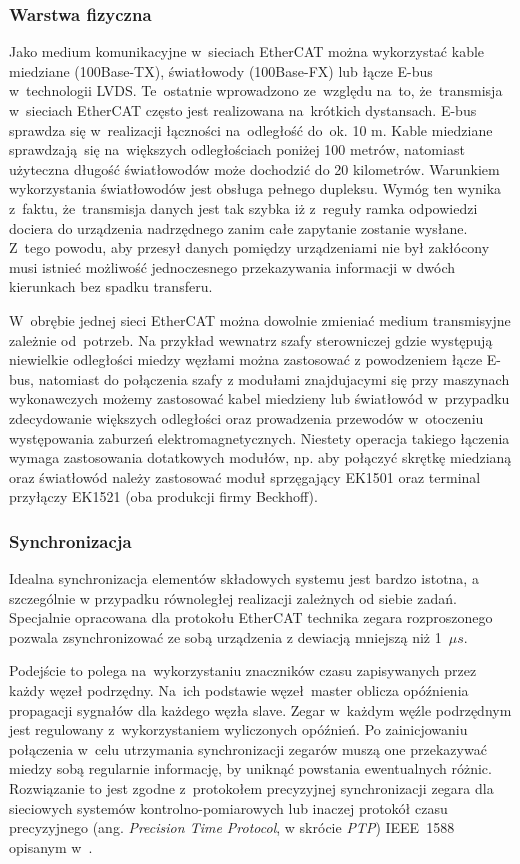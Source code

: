 \subsubsection{Warstwa fizyczna}
Jako medium komunikacyjne w~sieciach EtherCAT można wykorzystać kable miedziane (100Base-TX), światłowody (100Base-FX) lub łącze E-bus w~technologii LVDS. Te~ostatnie wprowadzono ze~względu na~to, że~transmisja w~sieciach EtherCAT często jest realizowana na~krótkich dystansach. E-bus sprawdza się w~realizacji łączności na~odległość do~ok. 10 m. Kable miedziane sprawdzają~się na~większych odległościach poniżej 100 metrów, natomiast użyteczna długość światłowodów może dochodzić do 20 kilometrów. Warunkiem wykorzystania światłowodów jest obsługa pełnego dupleksu. Wymóg ten wynika z~faktu, że~transmisja danych jest tak szybka iż z~reguły ramka odpowiedzi dociera do urządzenia nadrzędnego zanim całe zapytanie zostanie wysłane. Z~tego powodu, aby przesył danych pomiędzy urządzeniami nie był zakłócony musi istnieć możliwość jednoczesnego przekazywania informacji w dwóch kierunkach bez spadku transferu.

W~obrębie jednej sieci EtherCAT można dowolnie zmieniać medium transmisyjne zależnie od~potrzeb. Na przykład wewnatrz szafy sterowniczej gdzie występują niewielkie odległości miedzy węzłami można zastosować z powodzeniem łącze E-bus, natomiast do połączenia szafy z modułami znajdujacymi się przy maszynach wykonawczych możemy zastosować kabel miedzieny lub światłowód w~przypadku zdecydowanie większych odległości oraz prowadzenia przewodów w~otoczeniu występowania zaburzeń elektromagnetycznych. Niestety operacja takiego łączenia wymaga zastosowania dotatkowych modułów, np. aby połączyć skrętkę miedzianą oraz światłowód należy zastosować moduł sprzęgający EK1501 oraz terminal przyłączy EK1521 (oba produkcji firmy Beckhoff).

\subsubsection{Synchronizacja}
Idealna synchronizacja elementów składowych systemu jest bardzo istotna, a szczególnie w przypadku równoległej realizacji zależnych od siebie zadań. Specjalnie opracowana dla protokołu EtherCAT technika zegara rozproszonego pozwala zsynchronizować ze sobą urządzenia z dewiacją mniejszą niż 1~$\mu s$. 

Podejście to polega na~wykorzystaniu znaczników czasu zapisywanych przez każdy węzeł podrzędny. Na~ich podstawie węzeł~master oblicza opóźnienia propagacji sygnałów dla każdego węzła slave. Zegar w~każdym węźle podrzędnym jest regulowany z~wykorzystaniem wyliczonych opóźnień. Po zainicjowaniu połączenia w~celu utrzymania synchronizacji zegarów muszą one przekazywać miedzy sobą regularnie informację, by uniknąć powstania ewentualnych różnic. Rozwiązanie to jest zgodne z~protokołem precyzyjnej synchronizacji zegara dla sieciowych systemów kontrolno-pomiarowych lub inaczej protokół czasu precyzyjnego (ang. \textit{Precision Time Protocol}, w skrócie \textit{PTP}) IEEE~1588 opisanym w~\cite{ieee}.


